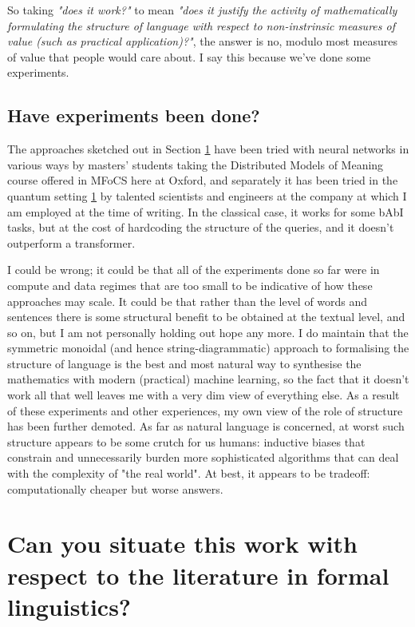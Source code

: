 So taking \emph{"does it work?"} to mean \emph{"does it justify the activity of mathematically formulating the structure of language with respect to non-instrinsic measures of value (such as practical application)?"}, the answer is no, modulo most measures of value that people would care about. I say this because we've done some experiments.

\subsection{Have experiments been done?}

The approaches sketched out in Section \ref{} have been tried with neural networks in various ways by masters' students taking the Distributed Models of Meaning course offered in MFoCS here at Oxford, and separately it has been tried in the quantum setting \ref{} by talented scientists and engineers at the company at which I am employed at the time of writing. In the classical case, it works for some bAbI tasks, but at the cost of hardcoding the structure of the queries, and it doesn't outperform a transformer.

I could be wrong; it could be that all of the experiments done so far were in compute and data regimes that are too small to be indicative of how these approaches may scale. It could be that rather than the level of words and sentences there is some structural benefit to be obtained at the textual level, and so on, but I am not personally holding out hope any more. I do maintain that the symmetric monoidal (and hence string-diagrammatic) approach to formalising the structure of language is the best and most natural way to synthesise the mathematics with modern (practical) machine learning, so the fact that it doesn't work all that well leaves me with a very dim view of everything else. As a result of these experiments and other experiences, my own view of the role of structure has been further demoted. As far as natural language is concerned, at worst such structure appears to be some crutch for us humans: inductive biases that constrain and unnecessarily burden more sophisticated algorithms that can deal with the complexity of "the real world". At best, it appears to be tradeoff: computationally cheaper but worse answers.

\section{Can you situate this work with respect to the literature in formal linguistics?}

